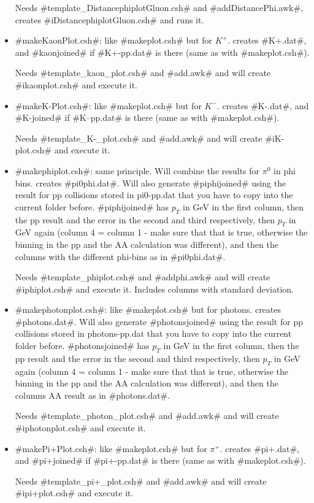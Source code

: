 \begin{itemize}
    Needs #template_DistancephiplotGluon.csh# and #addDistancePhi.awk#,\\ creates #iDistancephiplotGluon.csh# and runs it.

  \item #makeKaonPlot.csh#: like #makeplot.csh# but for $K^+$. creates #K+.dat#, and #kaonjoined# if #K+-pp.dat# is there 
    (same as with #makeplot.csh#).
    
    Needs #template_kaon_plot.csh# and #add.awk# and will create #ikaonplot.csh# and execute it.

  \item #makeK-Plot.csh#: like #makeplot.csh# but for $K^-$. creates #K-.dat#, and #K-joined# if #K--pp.dat# is there 
    (same as with #makeplot.csh#).
    
    Needs #template_K-_plot.csh# and #add.awk# and will create #iK-plot.csh# and execute it.
  
  \item #makephiplot.csh#: same principle. Will combine the results for $\pi^0$ in phi bins. creates #pi0phi.dat#.
    Will also generate #piphijoined# using the result for pp collisions stored in pi0-pp.dat that you have to copy into the current folder before.
    #piphijoined# has $p_T$ in GeV in the first column, then the pp result and the error in the second and third respectively, then 
    $p_T$ in GeV again (column 4 = column 1 - make sure that that is true, otherwise the binning in the pp and the AA calculation was different), and
    then the columns with the different phi-bins as in #pi0phi.dat#.

    Needs #template_phiplot.csh# and #addphi.awk# and will create #iphiplot.csh# and execute it. Includes columns with standard deviation.
   
  \item #makephotonplot.csh#: like #makeplot.csh# but for photons. creates #photons.dat#.
    Will also generate #photonsjoined# using the result for pp collisions stored in photons-pp.dat that you have to copy into the current folder before.
    #photonsjoined# has $p_T$ in GeV in the first column, then the pp result and the error in the second and third respectively, then 
    $p_T$ in GeV again (column 4 = column 1 - make sure that that is true, otherwise the binning in the pp and the AA calculation was different), and
    then the columns AA result as in #photons.dat#.
    
    Needs #template_photon_plot.csh# and #add.awk# and will create #iphotonplot.csh# and execute it.

  \item #makePi+Plot.csh#: like #makeplot.csh# but for $\pi^+$. creates #pi+.dat#, and #pi+joined# if #pi+-pp.dat# is there 
    (same as with #makeplot.csh#).
    
    Needs #template_pi+_plot.csh# and #add.awk# and will create #ipi+plot.csh# and execute it.
\end{itemize}

